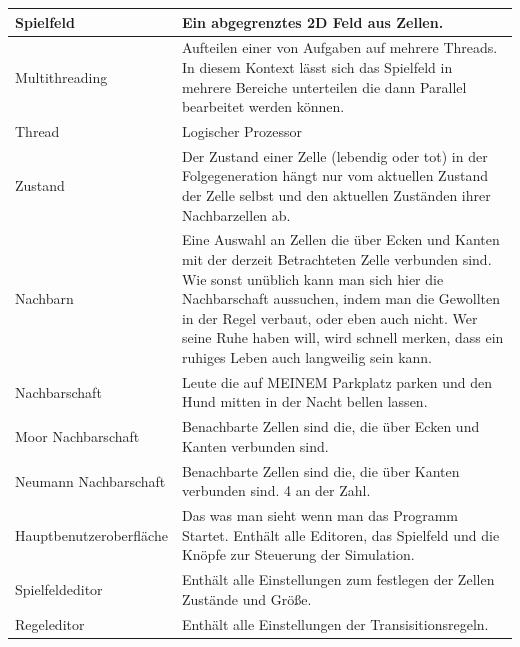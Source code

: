\documentclass[11pt,a4paper]{article}
\begin{document}
\begin{longtable}[m]{|m{8cm}|m{8cm}|}
 \hline
 Spielfeld & Ein abgegrenztes 2D Feld aus Zellen. \\
 \hline
 Multithreading & Aufteilen einer von Aufgaben auf mehrere Threads. In diesem Kontext lässt sich das Spielfeld in mehrere Bereiche unterteilen die dann Parallel bearbeitet werden können. \\
 \hline
 Thread & Logischer Prozessor \\
 \hline
 Zustand & Der Zustand einer Zelle (lebendig oder tot) in der Folgegeneration hängt nur vom aktuellen Zustand der Zelle selbst und den aktuellen Zuständen ihrer Nachbarzellen ab. \\
 \hline
 Nachbarn & Eine Auswahl an Zellen die über Ecken und Kanten mit der derzeit Betrachteten Zelle verbunden sind. Wie sonst unüblich kann man sich hier die Nachbarschaft aussuchen, indem man die Gewollten in der Regel verbaut, oder eben auch nicht. Wer seine Ruhe haben will, wird schnell merken, dass ein ruhiges Leben auch langweilig sein kann.\\ 
 \hline
 Nachbarschaft & Leute die auf MEINEM Parkplatz parken und den Hund mitten in der Nacht bellen lassen.\\
 \hline
 Moor Nachbarschaft &Benachbarte Zellen sind die, die über Ecken und Kanten verbunden sind.\\
 \hline
 Neumann Nachbarschaft &Benachbarte Zellen sind die, die über Kanten verbunden sind. 4 an der Zahl.\\
 \hline
 Hauptbenutzeroberfläche & Das was man sieht wenn man das Programm Startet. Enthält alle Editoren, das Spielfeld und die Knöpfe zur Steuerung der Simulation.\\
 \hline
 Spielfeldeditor & Enthält alle Einstellungen zum festlegen der Zellen Zustände und Größe. \\
 \hline
 Regeleditor & Enthält alle Einstellungen der Transisitionsregeln.\\
 \hline



\end{longtable}
\end{document}
